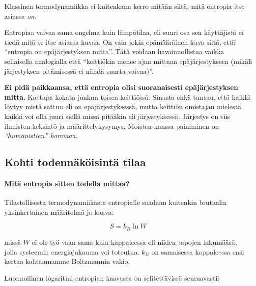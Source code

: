 \documentclass[12pt,a4paper,finnish]{book}
\begin{document}
Klassinen termodynamiikka 
ei kuitenkaan kerro mitään siitä, mitä entropia itse asiassa \textit{on}.

Entropiaa vaivaa sama ongelma kuin lämpötilaa, eli suuri osa sen käyttäjistä ei tiedä mitä se itse asiassa 
kuvaa. On vain jokin epämääräinen kuva siitä, että ``entropia on epäjärjestyksen mitta''. Tätä voidaan 
havainnollistaa vaikka sellaisella analogialla että ``keittiökin menee ajan mittaan epäjärjestykseen 
(mikäli järjestyksen pitämisessä ei nähdä suurta vaivaa)''. 

\textbf{Ei pidä paikkaansa, että entropia olisi suoranaisesti epäjärjestyksen mitta.} Koetapa kokata jonkun 
toisen keittiössä. Sinusta ehkä tuntuu, että kaikki löytyy mistä sattuu eli on epäjärjestyksessä, mutta keittiön 
omistajan mielestä kaikki voi olla juuri siellä missä pitääkin eli järjestyksessä. Järjestys on siis ihmisten 
keksintö ja määrittelykysymys. Moisten kanssa painiminen on \textit{``humanistien'' hommaa}.

\subsection{Kohti todennäköisintä tilaa}

\paragraph{Mitä entropia sitten todella mittaa?}

Tilastollisesta termodynamiikasta entropialle saadaan kuitenkin brutaalin yksinkertainen määritelmä ja kaava:

\begin{equation}
\label{eqn:S}
 S = k_B \ln W
\end{equation}

missä $W$ ei ole työ vaan sama kuin kappaleessa  eli niiden tapojen lukumäärä, jolla 
systeemin energiajakauma voi toteutua. $k_B$ on samaisessa kappaleessa ensi kertaa kohtaamamme Boltzmannin vakio.

Luonnollinen logaritmi entropian kaavassa on selitettävissä seuraavasti:
\end{document}
